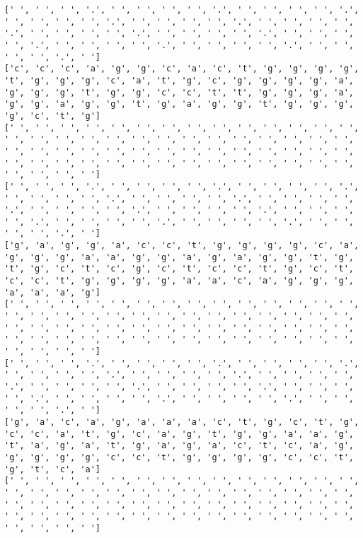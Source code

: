 \documentclass{article}
\begin{document}
\begin{Verbatim}
[' ', ' ', ' ', '.', ' ', ' ', ' ', ' ', '.', ' ', ' ', ' ', ' ', '.', ' ', ' ', ' ', ' ', '.', ' ', ' ', ' ', ' ', '.', ' ', ' ', ' ', ' ', '.', ' ', ' ', ' ', ' ', '.', ' ', ' ', ' ', ' ', '.', ' ', ' ', ' ', ' ', '.', ' ', ' ', ' ', ' ', '.', ' ', ' ', ' ', ' ', '.', ' ', ' ', ' ', ' ', '.', ' ']
['c', 'c', 'c', 'a', 'g', 'g', 'c', 'a', 'c', 't', 'g', 'g', 'g', 'g', 't', 'g', 'g', 'g', 'c', 'a', 't', 'g', 'c', 'g', 'g', 'g', 'g', 'a', 'g', 'g', 'g', 't', 'g', 'g', 'c', 'c', 't', 't', 'g', 'g', 'g', 'a', 'g', 'g', 'a', 'g', 'g', 't', 'g', 'a', 'g', 'g', 't', 'g', 'g', 'g', 'g', 'c', 't', 'g']
[' ', ' ', ' ', ' ', ' ', ' ', ' ', ' ', ' ', ' ', ' ', ' ', ' ', ' ', ' ', ' ', ' ', ' ', ' ', ' ', ' ', ' ', ' ', ' ', ' ', ' ', ' ', ' ', ' ', ' ', ' ', ' ', ' ', ' ', ' ', ' ', ' ', ' ', ' ', ' ', ' ', ' ', ' ', ' ', ' ', ' ', ' ', ' ', ' ', ' ', ' ', ' ', ' ', ' ', ' ', ' ', ' ', ' ', ' ', ' ']
[' ', ' ', ' ', '.', ' ', ' ', ' ', ' ', '.', ' ', ' ', ' ', ' ', '.', ' ', ' ', ' ', ' ', '.', ' ', ' ', ' ', ' ', '.', ' ', ' ', ' ', ' ', '.', ' ', ' ', ' ', ' ', '.', ' ', ' ', ' ', ' ', '.', ' ', ' ', ' ', ' ', '.', ' ', ' ', ' ', ' ', '.', ' ', ' ', ' ', ' ', '.', ' ', ' ', ' ', ' ', '.', ' ']
['g', 'a', 'g', 'g', 'a', 'c', 'c', 't', 'g', 'g', 'g', 'g', 'c', 'a', 'g', 'g', 'g', 'a', 'a', 'g', 'g', 'a', 'g', 'a', 'g', 'g', 't', 'g', 't', 'g', 'c', 't', 'c', 'g', 'c', 't', 'c', 'c', 't', 'g', 'c', 't', 'c', 'c', 't', 'g', 'g', 'g', 'g', 'a', 'a', 'c', 'a', 'g', 'g', 'g', 'a', 'a', 'a', 'g']
[' ', ' ', ' ', ' ', ' ', ' ', ' ', ' ', ' ', ' ', ' ', ' ', ' ', ' ', ' ', ' ', ' ', ' ', ' ', ' ', ' ', ' ', ' ', ' ', ' ', ' ', ' ', ' ', ' ', ' ', ' ', ' ', ' ', ' ', ' ', ' ', ' ', ' ', ' ', ' ', ' ', ' ', ' ', ' ', ' ', ' ', ' ', ' ', ' ', ' ', ' ', ' ', ' ', ' ', ' ', ' ', ' ', ' ', ' ', ' ']
[' ', ' ', ' ', '.', ' ', ' ', ' ', ' ', '.', ' ', ' ', ' ', ' ', '.', ' ', ' ', ' ', ' ', '.', ' ', ' ', ' ', ' ', '.', ' ', ' ', ' ', ' ', '.', ' ', ' ', ' ', ' ', '.', ' ', ' ', ' ', ' ', '.', ' ', ' ', ' ', ' ', '.', ' ', ' ', ' ', ' ', '.', ' ', ' ', ' ', ' ', '.', ' ', ' ', ' ', ' ', '.', ' ']
['g', 'a', 'c', 'a', 'g', 'a', 'a', 'a', 'c', 't', 'g', 'c', 't', 'g', 'c', 'c', 'a', 't', 'g', 'c', 'a', 'g', 't', 'g', 'g', 'a', 'a', 'g', 't', 'a', 'g', 'a', 't', 'g', 'a', 'g', 'a', 'c', 't', 'c', 'a', 'g', 'g', 'g', 'g', 'g', 'c', 'c', 't', 'g', 'g', 'g', 'g', 'c', 'c', 't', 'g', 't', 'c', 'a']
[' ', ' ', ' ', ' ', ' ', ' ', ' ', ' ', ' ', ' ', ' ', ' ', ' ', ' ', ' ', ' ', ' ', ' ', ' ', ' ', ' ', ' ', ' ', ' ', ' ', ' ', ' ', ' ', ' ', ' ', ' ', ' ', ' ', ' ', ' ', ' ', ' ', ' ', ' ', ' ', ' ', ' ', ' ', ' ', ' ', ' ', ' ', ' ', ' ', ' ', ' ', ' ', ' ', ' ', ' ', ' ', ' ', ' ', ' ', ' ']

\end{Verbatim}
\end{document}
